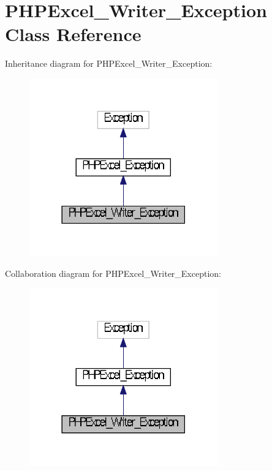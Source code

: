 \section{P\+H\+P\+Excel\+\_\+\+Writer\+\_\+\+Exception Class Reference}
\label{class_p_h_p_excel___writer___exception}


Inheritance diagram for P\+H\+P\+Excel\+\_\+\+Writer\+\_\+\+Exception\+:\nopagebreak
\begin{figure}[H]
\begin{center}
\leavevmode
\includegraphics[width=230pt]{class_p_h_p_excel___writer___exception__inherit__graph}
\end{center}
\end{figure}


Collaboration diagram for P\+H\+P\+Excel\+\_\+\+Writer\+\_\+\+Exception\+:\nopagebreak
\begin{figure}[H]
\begin{center}
\leavevmode
\includegraphics[width=230pt]{class_p_h_p_excel___writer___exception__coll__graph}
\end{center}
\end{figure}
